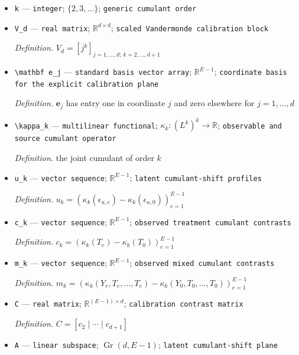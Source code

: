 \documentclass{article}
\begin{document}
\begin{itemize}
  \par\smallskip\noindent\emph{Definition.} \(P_e=\mathcal L(T_e,Y_e)\)
  \item \texttt{k} --- \texttt{integer}; \(\{2,3,\ldots\}\); \texttt{generic cumulant order}
  \item \texttt{V\_\allowbreak{}d} --- \texttt{real matrix}; \(\mathbb R^{d\times d}\); \texttt{scaled Vandermonde calibration block}
  \par\smallskip\noindent\emph{Definition.} \(V_d=[j^k]_{j=1,\ldots,d;\ k=2,\ldots,d+1}\)
  \item \texttt{\textbackslash{}\allowbreak{}mathbf e\_\allowbreak{}j} --- \texttt{standard basis vector array}; \(\mathbb R^{E-1}\); \texttt{coordinate basis for the explicit calibration plane}
  \par\smallskip\noindent\emph{Definition.} \(\mathbf e_j\) has entry one in coordinate \(j\) and zero elsewhere for \(j=1,\ldots,d\)
  \item \texttt{\textbackslash{}\allowbreak{}kappa\_\allowbreak{}k} --- \texttt{multilinear functional}; \(\kappa_k:(L^k)^k\to\mathbb R\); \texttt{observable and source cumulant operator}
  \par\smallskip\noindent\emph{Definition.} the joint cumulant of order \(k\)
  \item \texttt{u\_\allowbreak{}k} --- \texttt{vector sequence}; \(\mathbb R^{E-1}\); \texttt{latent cumulant-\allowbreak{}shift profiles}
  \par\smallskip\noindent\emph{Definition.} \(u_k=(\kappa_k(\epsilon_{u,e})-\kappa_k(\epsilon_{u,0}))_{e=1}^{E-1}\)
  \item \texttt{c\_\allowbreak{}k} --- \texttt{vector sequence}; \(\mathbb R^{E-1}\); \texttt{observed treatment cumulant contrasts}
  \par\smallskip\noindent\emph{Definition.} \(c_k=(\kappa_k(T_e)-\kappa_k(T_0))_{e=1}^{E-1}\)
  \item \texttt{m\_\allowbreak{}k} --- \texttt{vector sequence}; \(\mathbb R^{E-1}\); \texttt{observed mixed cumulant contrasts}
  \par\smallskip\noindent\emph{Definition.} \(m_k=(\kappa_k(Y_e,T_e,\ldots,T_e)-\kappa_k(Y_0,T_0,\ldots,T_0))_{e=1}^{E-1}\)
  \item \texttt{C} --- \texttt{real matrix}; \(\mathbb R^{(E-1)\times d}\); \texttt{calibration contrast matrix}
  \par\smallskip\noindent\emph{Definition.} \(C=[c_2\mid\cdots\mid c_{d+1}]\)
  \item \texttt{A} --- \texttt{linear subspace}; \(\operatorname{Gr}(d,E-1)\); \texttt{latent cumulant-\allowbreak{}shift plane}

\end{itemize}
\end{document}
